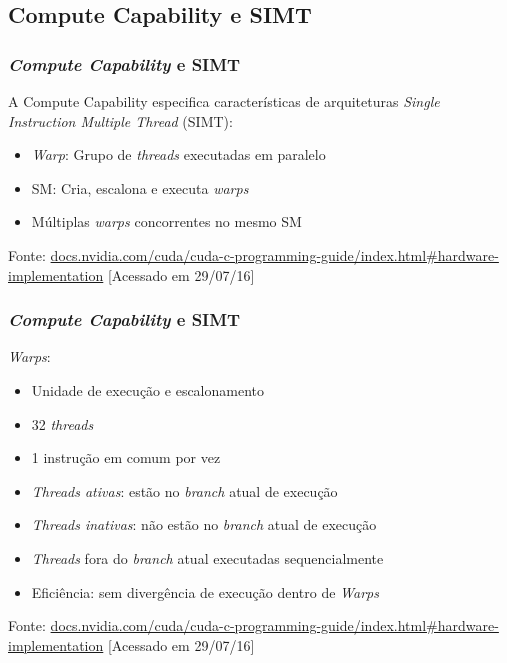 \documentclass[10pt, compress]{beamer}
\begin{document}
\subsection{Compute Capability e SIMT}

\begin{frame}
    \frametitle{\textit{Compute Capability} e SIMT}
    A \alert{Compute Capability} especifica características de
    arquiteturas \textit{Single Instruction Multiple Thread} (SIMT):
    \begin{itemize}
        \item \textit{Warp}: Grupo de \textit{threads} executadas em \alert{paralelo}
        \item SM: Cria, escalona e executa \textit{warps}
            \pause
        \item Múltiplas \textit{warps} \alert{concorrentes} no mesmo SM
    \end{itemize}
    \vfill

    \begin{center}
        \tiny{Fonte: \url{docs.nvidia.com/cuda/cuda-c-programming-guide/index.html\#hardware-implementation} [Acessado em 29/07/16]}
    \end{center}
\end{frame}

\begin{frame}
    \frametitle{\textit{Compute Capability} e SIMT}
    \textit{Warps}:
    \begin{itemize}
        \item Unidade de execução e escalonamento
        \item 32 \textit{threads}
            \pause
        \item 1 \alert{instrução em comum} por vez
            \pause
        \item \textit{Threads ativas}: estão no \textit{branch} atual de
            execução
        \item \textit{Threads inativas}: \alert{não} estão no \textit{branch}
            atual de execução
            \pause
        \item \textit{Threads} fora do \textit{branch} atual executadas
            \alert{sequencialmente}
            \pause
        \item Eficiência: sem divergência de execução dentro de \textit{Warps}
    \end{itemize}
    \vfill

    \begin{center}
        \tiny{Fonte: \url{docs.nvidia.com/cuda/cuda-c-programming-guide/index.html\#hardware-implementation} [Acessado em 29/07/16]}
    \end{center}
\end{frame}
\end{document}
